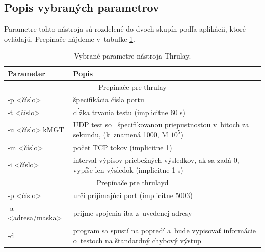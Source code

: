         \subsection{Popis vybraných parametrov} \label{thrulay_param}
        Parametre tohto nástroja sú rozdelené do dvoch skupín podľa aplikácii,
        ktoré ovládajú. Prepínače nájdeme v~tabuľke \ref{tab_thrulay_parametre}.

        \begin{table}[H]
            \begin{center}
                \begin{tabular}{|l|p{11cm}|}
                    \hline
                     \textbf{Parameter}  &  \textbf{Popis}  \\
                    \hline
                    \multicolumn{2}{|c|}{Prepínače pre thrulay} \\
                    \hline
                    -p \textless číslo\textgreater & špecifikácia čísla portu \\
                    -t \textless číslo\textgreater & dĺžka trvania testu
                        (implicitne 60 s) \\
                    -u \textless číslo\textgreater[kMGT]& UDP test
                        so ~špecifikovanou priepustnosťou v~bitoch za sekundu,
                        (k~znamená 1000, M $10^5$) \\
                    -m \textless číslo\textgreater & počet TCP tokov 
                        (implicitne 1) \\
                    -i \textless číslo\textgreater & interval výpisov
                        priebežných výsledkov,
                        ak sa zadá 0, vypíše len výsledok
                        (implicitne 1 s)\\
                    \hline  
                    \multicolumn{2}{|c|}{Prepínače pre thrulayd} \\
                    \hline
                    -p \textless číslo\textgreater &  určí prijímajúci port
                        (implicitne 5003)\\ 
                    -a \textless adresa/maska\textgreater & 
                        prijme spojenia iba z~uvedenej adresy \\
                    -d     &  program sa spustí na popredí a~bude vypisovať
                        informácie o~testoch na štandardný chybový výstup\\ 
                    \hline
                \end{tabular}
                \caption{Vybrané parametre nástroja Thrulay.} 
                \label{tab_thrulay_parametre}
            \end{center}
        \end{table}

